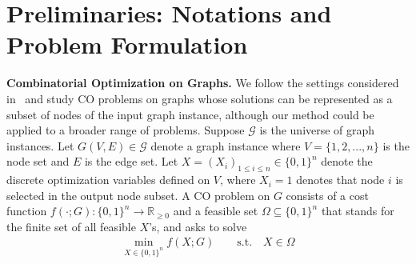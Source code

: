 \vspace{-0.5mm}
\section{Preliminaries: Notations and Problem Formulation} \label{sec:prelim}
\vspace{-1mm}
\textbf{Combinatorial Optimization on Graphs.} We follow the settings considered in~\citep{karalias2020erdos,wang2022unsupervised,schuetz2022combinatorial} and study CO problems on graphs whose solutions can be represented as a subset of nodes of the input graph instance, although our method could be applied to a broader range of problems. Suppose $\mathcal{G}$ is the universe of graph instances. Let $G(V,E)\in \mathcal{G}$ denote a graph instance where $V=\{1,2,...,n\}$ is the node set and $E$ is the edge set. Let $X=(X_i)_{1\leq i \leq n} \in \{0,1\}^n$ denote the discrete optimization variables defined on $V$, where $X_i=1$ denotes that node $i$ is selected in the output node subset. A CO problem on $G$ consists of a cost function $f(\cdot;G):\{0,1\}^n \rightarrow \mathbb{R}_{\geq0}$ and a feasible set $\Omega\subseteq \{0,1\}^n$ that stands for the finite set of all feasible $X$'s, and asks to solve %
\begin{equation}
\label{eq:def_CO}
\begin{aligned}
\min_{X\in \{0,1\}^n} f(X;G) \quad \quad \text{s.t.} \quad X \in \Omega
\end{aligned}
\end{equation}\vspace{-2mm}


